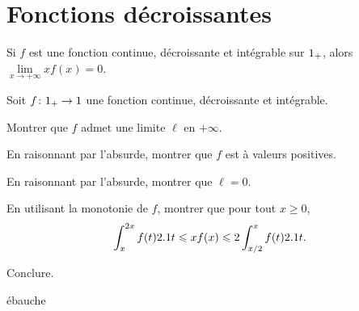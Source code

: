 \section{Fonctions décroissantes}




\begin{prop}
Si $f$ est une fonction continue, décroissante et intégrable sur $\R_+$, alors $\lim\limits_{x\to+\infty} x f(x) = 0$.
\end{prop}

\begin{exercice}
Soit $\fonctionens[f]{\Rp}{\R}$ une fonction continue, décroissante et intégrable.
\begin{questions}
\item Montrer que $f$ admet une limite $\ell$ en $+\infty$.

\item En raisonnant par l'absurde, montrer que $f$ est à valeurs positives.

\item En raisonnant par l'absurde, montrer que $\ell = 0$.

\item En utilisant la monotonie de $f$, montrer que pour tout $x \geqslant 0$,
\[
\int_x^{2 x} f(t) \d t \leqslant x f(x) \leqslant 2 \int_{x/2}^x f(t) \d t.
\]

\item Conclure.
\end{questions}
\end{exercice}

\begin{marginfigure}[-2cm]
    \centering
    \caption{ébauche}
\end{marginfigure}

